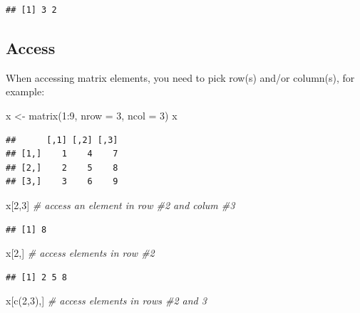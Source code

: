 \documentclass[
]{book}
\newenvironment{Shaded}{\begin{snugshade}}{\end{snugshade}}
\newcommand{\AttributeTok}[1]{\textcolor[rgb]{0.77,0.63,0.00}{#1}}
\newcommand{\CommentTok}[1]{\textcolor[rgb]{0.56,0.35,0.01}{\textit{#1}}}
\newcommand{\DecValTok}[1]{\textcolor[rgb]{0.00,0.00,0.81}{#1}}
\newcommand{\FunctionTok}[1]{\textcolor[rgb]{0.00,0.00,0.00}{#1}}
\newcommand{\NormalTok}[1]{#1}
\newcommand{\OtherTok}[1]{\textcolor[rgb]{0.56,0.35,0.01}{#1}}
\newcommand{\SpecialCharTok}[1]{\textcolor[rgb]{0.00,0.00,0.00}{#1}}
\begin{document}
\begin{verbatim}
## [1] 3 2
\end{verbatim}

\hypertarget{access-1}{%
\subsection{Access}\label{access-1}}

When accessing matrix elements, you need to pick row(s) and/or column(s), for example:

\begin{Shaded}
\begin{Highlighting}[]
\NormalTok{x }\OtherTok{\textless{}{-}} \FunctionTok{matrix}\NormalTok{(}\DecValTok{1}\SpecialCharTok{:}\DecValTok{9}\NormalTok{, }\AttributeTok{nrow =} \DecValTok{3}\NormalTok{, }\AttributeTok{ncol =} \DecValTok{3}\NormalTok{)}
\NormalTok{x}
\end{Highlighting}
\end{Shaded}

\begin{verbatim}
##      [,1] [,2] [,3]
## [1,]    1    4    7
## [2,]    2    5    8
## [3,]    3    6    9
\end{verbatim}

\begin{Shaded}
\begin{Highlighting}[]
\NormalTok{x[}\DecValTok{2}\NormalTok{,}\DecValTok{3}\NormalTok{] }\CommentTok{\# access an element in row \#2 and colum \#3}
\end{Highlighting}
\end{Shaded}

\begin{verbatim}
## [1] 8
\end{verbatim}

\begin{Shaded}
\begin{Highlighting}[]
\NormalTok{x[}\DecValTok{2}\NormalTok{,] }\CommentTok{\# access elements in row \#2}
\end{Highlighting}
\end{Shaded}

\begin{verbatim}
## [1] 2 5 8
\end{verbatim}

\begin{Shaded}
\begin{Highlighting}[]
\NormalTok{x[}\FunctionTok{c}\NormalTok{(}\DecValTok{2}\NormalTok{,}\DecValTok{3}\NormalTok{),] }\CommentTok{\# access elements in rows \#2 and 3}
\end{Highlighting}
\end{Shaded}
\end{document}
